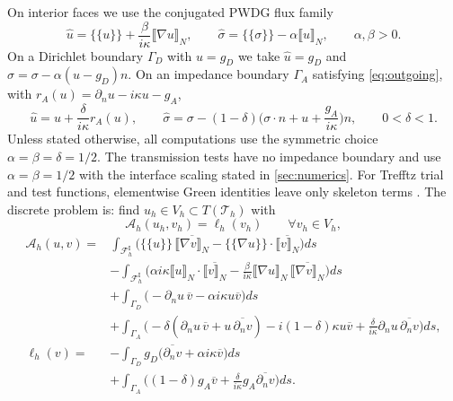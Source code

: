 \documentclass[11pt]{article}
\newcommand{\ii}{i}
\newcommand{\Th}{\mathcal{T}_h}
\newcommand{\FhI}{\mathcal{F}_h^{\mathrm I}}
\newcommand{\avg}[1]{\{\!\!\{#1\}\!\!\}}
\newcommand{\jump}[1]{\llbracket #1\rrbracket}
\numberwithin{equation}{section}
\begin{document}
On interior faces we use the conjugated PWDG flux family \citep{CessenatDespres1998,GittelsonHiptmairPerugia2009,HiptmairMoiolaPerugia2011}
\begin{equation}\label{eq:interior-fluxes}
 \widehat u=\avg{u}+\frac{\beta}{\ii\kappa}\jump{\nabla u}_N,
 \qquad
 \widehat\sigma=\avg{\sigma}-\alpha\jump{u}_N,\qquad \alpha,\beta>0.
\end{equation}
On a Dirichlet boundary $\Gamma_D$ with $u=g_D$ we take $\widehat u=g_D$ and $\widehat\sigma=\sigma-\alpha(u-g_D)n$.  On an impedance boundary $\Gamma_A$ satisfying \eqref{eq:outgoing}, with $r_A(u)=\partial_nu-\ii\kappa u-g_A$,
\begin{equation}\label{eq:imp-flux}
 \widehat u=u+\frac{\delta}{\ii\kappa}r_A(u),
 \qquad
 \widehat\sigma=\sigma-(1-\delta)\Big(\sigma\cdot n+u+\frac{g_A}{\ii\kappa}\Big)n,
 \qquad 0<\delta<1.
\end{equation}
Unless stated otherwise, all computations use the symmetric choice $\alpha=\beta=\delta=1/2$.  The transmission tests have no impedance boundary and use $\alpha=\beta=1/2$ with the interface scaling stated in \cref{sec:numerics}.
For Trefftz trial and test functions, elementwise Green identities leave only skeleton terms \citep{HiptmairMoiolaPerugia2011,HiptmairMoiolaPerugiaSurvey}.  The discrete problem is: find $u_h\in V_h\subset T(\Th)$ with
\begin{equation}\label{eq:dg-problem}
 \mathscr A_h(u_h,v_h)=\ell_h(v_h)\qquad\forall v_h\in V_h,
\end{equation}
\begin{align}
\mathscr A_h(u,v)
={}&\int_{\FhI}\Big(
 \avg{u}\,\overline{\jump{\nabla v}_N}
 -\avg{\nabla u}\cdot\overline{\jump{v}_N}\Big)ds
 \nonumber\\
 &-\int_{\FhI}\Big(
 \alpha\ii\kappa\jump{u}_N\cdot\overline{\jump{v}_N}
 -\frac{\beta}{\ii\kappa}\jump{\nabla u}_N\,\overline{\jump{\nabla v}_N}\Big)ds
 \nonumber\\
 &+\int_{\Gamma_D}\Big(-\partial_nu\,\overline v-\alpha\ii\kappa u\overline v\Big)ds
 \nonumber\\
 &+\int_{\Gamma_A}\Big(
 -\delta(\partial_nu\,\overline v+u\,\overline{\partial_nv})
 -\ii(1-\delta)\kappa u\overline v
 +\frac{\delta}{\ii\kappa}\partial_nu\,\overline{\partial_nv}\Big)ds,
 \label{eq:Ah-interior}\\
\ell_h(v)
={}&-\int_{\Gamma_D}g_D\big(\overline{\partial_nv}+\alpha\ii\kappa\overline v\big)ds
\nonumber\\
 &+\int_{\Gamma_A}\Big((1-\delta)g_A\overline v+\frac{\delta}{\ii\kappa}g_A\overline{\partial_nv}\Big)ds.
 \label{eq:lh}
\end{align}
\end{document}
